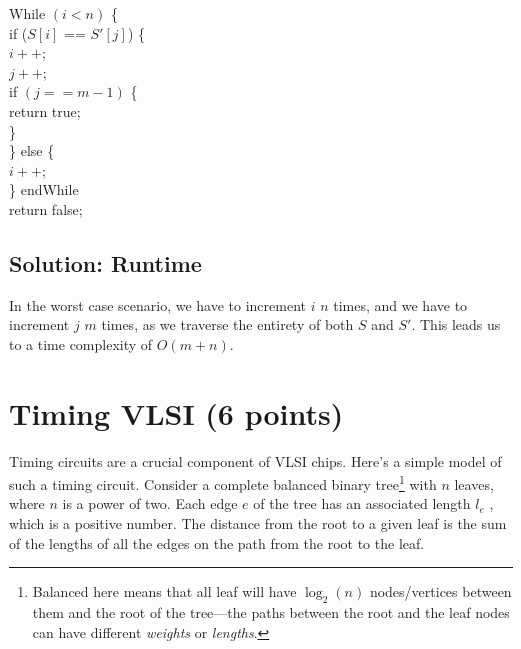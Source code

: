 \documentclass[letter,11pt]{article}
\begin{document}
While $(i < n)$ \{ \\
\indent \indent  if ($S[i]$ == $S'[j]$) \{ \\
\indent \indent \indent $i++$; \\
\indent \indent \indent $j++$; \\
\indent \indent \indent    if $(j == m - 1)$ \{ \\
\indent \indent \indent \indent     return true; \\
\indent \indent \indent   \} \\
\indent \indent \} else \{ \\
\indent \indent  $i++$; \\
\indent \} endWhile \\
\indent return false;

\subsection{Solution: Runtime}

In the worst case scenario, we have to increment $i$ $n$ times, and we have to increment $j$ $m$ times, as we traverse the entirety of both $S$ and $S'$. This leads us to a time complexity of $O(m + n)$.




\section{Timing VLSI (6 points)}

Timing circuits are a crucial component of VLSI chips. Here’s a simple model of such a timing circuit. Consider a complete balanced binary tree\footnote{Balanced here means that all leaf will have $\log_2(n)$ nodes/vertices between them and the root of the tree---the paths between the root and the leaf nodes can have different \emph{weights} or \emph{lengths}.}  with $n$ leaves, where $n$ is a power of two. Each edge $e$ of the tree has an associated length $l_e$ , which is a positive number. The distance from the root to a given leaf is the sum of the lengths of all the edges on the path from the root to the leaf.
\end{document}
